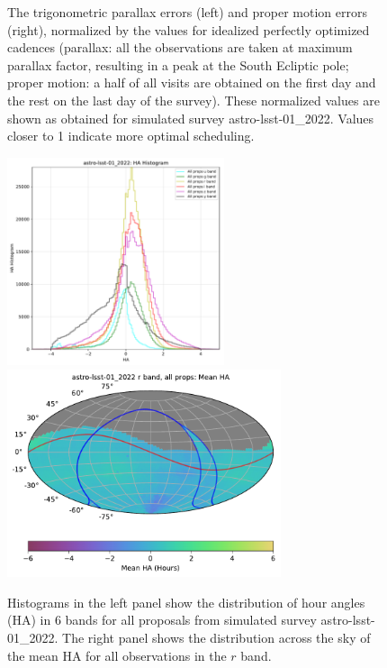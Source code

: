 \documentclass[DM,authoryear,toc]{lsstdoc}
\begin{document}
\begin{figure}[htb]
\caption{The trigonometric parallax errors (left) and proper motion errors (right), normalized
by the values for idealized perfectly optimized cadences (parallax: all the observations are taken
at maximum parallax factor, resulting in a peak at the South Ecliptic pole; proper motion:
a half of all visits are obtained on the first day and the rest on the last day of the survey). These normalized values are shown as
obtained for simulated survey astro-lsst-01\_2022. Values closer to 1 indicate more optimal scheduling.
\label{fig:baseline_parapm}}
\end{figure}


\begin{figure}[htb]
\centering
\includegraphics[height=2.4in]{figures/astro-lsst-01_2022-ha_hist_per_filter.pdf}
\includegraphics[height=2.4in]{figures/astro-lsst-01_2022_Mean_HA_r_band_all_props_OPSI_SkyMap.pdf}
\caption{Histograms in the left panel show the distribution of hour angles (HA) in
6 bands for all proposals from simulated survey astro-lsst-01\_2022.
The right panel shows the distribution across the sky of the mean HA for
all observations in the $r$ band. 
\label{fig:baseline_ha}}
\end{figure}
\end{document}
